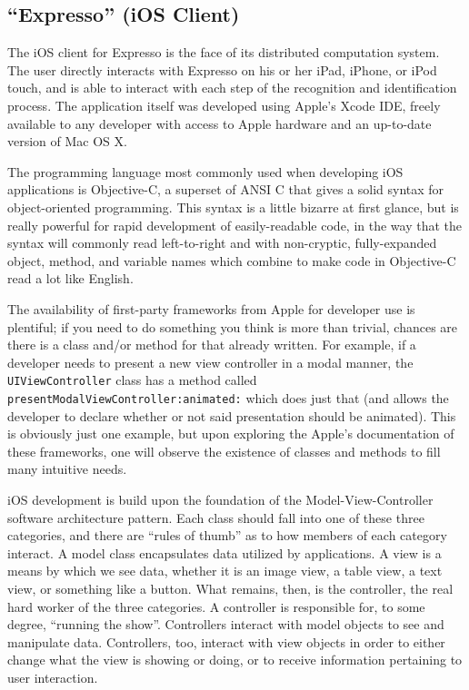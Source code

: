 \documentclass{acm_proc_article-sp}
\begin{document}
\subsection{``Expresso'' (iOS Client)}
The iOS client for Expresso is the face of its distributed computation system. The user directly interacts with Expresso on his or her iPad, iPhone, or iPod touch, and is able to interact with each step of the recognition and identification process. The application itself was developed using Apple's Xcode IDE, freely available to any developer with access to Apple hardware and an up-to-date version of Mac OS X.

The programming language most commonly used when developing iOS applications is Objective-C, a superset of ANSI C that gives a solid syntax for object-oriented programming. This syntax is a little bizarre at first glance, but is really powerful for rapid development of easily-readable code, in the way that the syntax will commonly read left-to-right and with non-cryptic, fully-expanded object, method, and variable names which combine to make code in Objective-C read a lot like English.

The availability of first-party frameworks from Apple for developer use is plentiful; if you need to do something you think is more than trivial, chances are there is a class and/or method for that already written. For example, if a developer needs to present a new view controller in a modal manner, the \texttt{UIViewController} class has a method called \texttt{presentModalViewController:animated:} which does just that (and allows the developer to declare whether or not said presentation should be animated). This is obviously just one example, but upon exploring the Apple's documentation of these frameworks, one will observe the existence of classes and methods to fill many intuitive needs.

iOS development is build upon the foundation of the Model-View-Controller software architecture pattern. Each class should fall into one of these three categories, and there are ``rules of thumb'' as to how members of each category interact. A model class encapsulates data utilized by applications. A view is a means by which we see data, whether it is an image view, a table view, a text view, or something like a button. What remains, then, is the controller, the real hard worker of the three categories. A controller is responsible for, to some degree, ``running the show''. Controllers interact with model objects to see and manipulate data. Controllers, too, interact with view objects in order to either change what the view is showing or doing, or to receive information pertaining to user interaction.
\end{document}
